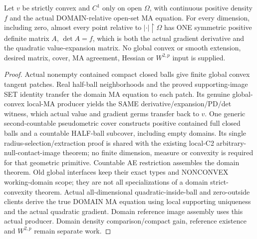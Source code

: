 \begin{lemma}
  \label{lem:convex-domain-gradient-derivative}
  \leanok
  Let $v$ be strictly convex and $C^1$ only on open $\Omega$, with continuous
  positive density $f$ and the actual DOMAIN-relative open-set MA equation.
  For every dimension, including zero, almost every point relative to
  $|\cdot|\mathbin{\upharpoonright}\Omega$ has ONE symmetric positive definite
  matrix $A$, $\det A=f$, which is both the actual gradient derivative and the
  quadratic value-expansion matrix. No global convex or smooth extension,
  desired matrix, cover, MA agreement, Hessian or $W^{2,p}$ input is supplied.
\end{lemma}
\begin{proof}
  \leanok
  Actual nonempty contained compact closed balls give finite global convex
  tangent patches. Real half-ball neighborhoods and the proved supporting-image
  SET identity transfer the domain MA equation to each patch. Its genuine
  global-convex local-MA producer yields the SAME derivative/expansion/PD/det
  witness, which actual value and gradient germs transfer back to $v$.
  One generic second-countable pseudometric cover constructs positive contained
  full closed balls and a countable HALF-ball subcover, including empty domains.
  Its single radius-selection/extraction proof is shared with the existing
  local-C2 arbitrary-null-contact-image theorem; no finite dimension, measure
  or convexity is required for that geometric primitive. Countable AE restriction
  assembles the domain theorem. Old global interfaces keep their exact types and
  NONCONVEX working-domain scope; they are not all specializations of a domain
  strict-convexity theorem. Actual all-dimensional quadratic-inside-ball and
  zero-outside clients derive the true DOMAIN MA equation using local supporting
  uniqueness and the actual quadratic gradient. Domain reference image assembly uses this actual producer. Domain density
  comparison/compact gain, reference existence and $W^{2,p}$ remain separate work.
\end{proof}

